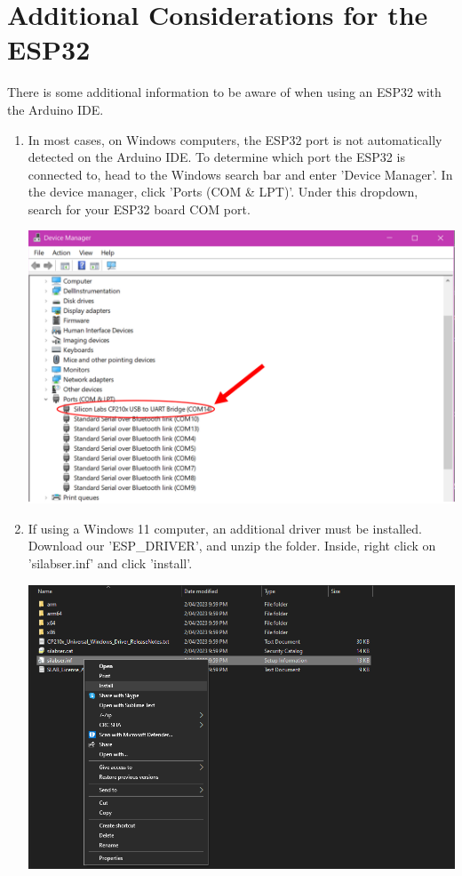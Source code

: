\documentclass[a4paper,12pt]{report}
\newcommand{\imageWidth}{140mm}
\begin{document}
\newpage
\section*{Additional Considerations for the ESP32}
    There is some additional information to be aware of when using an ESP32 with the Arduino IDE.
    \begin{enumerate}
        \item In most cases, on Windows computers, the ESP32 port is not automatically detected on the Arduino IDE. To determine which port the ESP32 is connected to, head to the Windows search bar and enter 'Device Manager'. In the device manager, click
        \newline
        'Ports (COM \& LPT)'. Under this dropdown, search for your ESP32 board COM port.
        \begin{center}
            \includegraphics[width = \imageWidth]{Assets/device_manager.png}
        \end{center}
        \item If using a Windows 11 computer, an additional driver must be installed. Download our 'ESP\_DRIVER', and unzip the folder. Inside, right click on 'silabser.inf' and click 'install'.
        \begin{center}
            \includegraphics[width = \imageWidth]{Assets/esp_driver.png}
        \end{center}
    \end{enumerate}
\newpage
\end{document}
